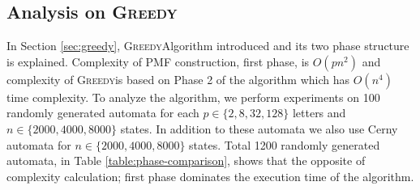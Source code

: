 \documentclass[12pt]{article}
\newcommand{\comment}[2]{{\color{red}{\bf (#1: #2)}}}
\newcommand{\greedyAlgo}{\textsc{Greedy}}
\begin{document}
\subsection{Analysis on \greedyAlgo}
\label{sec:greedy-analysis}


In Section \ref{sec:greedy}, \greedyAlgo \space Algorithm introduced and its two phase structure is explained. Complexity of PMF construction, first phase, is $O(pn^2)$ and complexity of \greedyAlgo \space is based on Phase 2 of the algorithm which has $O(n^4)$ time complexity. To analyze the algorithm, we perform experiments on 100 randomly generated automata for each  $p \in \{2, 8, 32, 128\}$ letters and  $n \in \{2000, 4000, 8000\}$ states. In addition to these automata we also use Cerny automata \cite{cerny} for $n \in \{2000, 4000, 8000\}$ states. Total 1200 randomly generated automata, in Table \ref{table:phase-comparison}, shows that the opposite of complexity calculation; first phase dominates the execution time of the algorithm.

\begin{table}[ht]
	\begin{center}
	\end{center}
	\caption{Sequential PMF construction time ($t_{PMF}$), and overall time ($t_{ALL}$) in seconds}
	\label{table:phase-comparison}
\end{table}

\comment{sertac}{Phase 2 kac iteration oldu deneyi eklenebilir}
\end{document}
